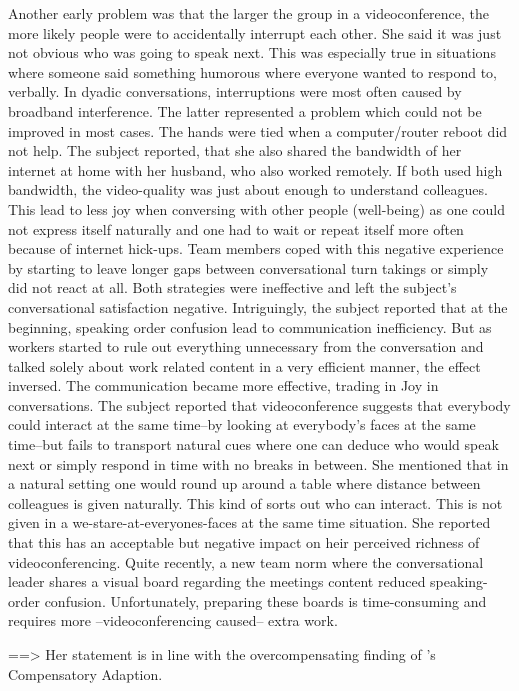 \documentclass[man]{apa7}
\begin{document}
Another early problem was that the larger the group in a videoconference, the more likely people were to accidentally interrupt each other. She said it was just not obvious who was going to speak next. This was especially true in situations where someone said something humorous where everyone wanted to respond to, verbally. In dyadic conversations, interruptions were most often caused by broadband interference. The latter represented a problem which could not be improved in most cases. The hands were tied when a computer/router reboot did not help. The subject reported, that she also shared the bandwidth of her internet at home with her husband, who also worked remotely. If both used high bandwidth, the video-quality was just about enough to understand colleagues. This lead to less joy when conversing with other people (well-being) as one could not express itself naturally and one had to wait or repeat itself more often because of internet hick-ups. Team members coped with this negative experience by starting to leave longer gaps between conversational turn takings or simply did not react at all. Both strategies were ineffective and left the subject's conversational satisfaction negative. Intriguingly, the subject reported that at the beginning, speaking order confusion lead to communication inefficiency. But as workers started to rule out everything unnecessary from the conversation and talked solely about work related content in a very efficient manner, the effect inversed. The communication became more effective, trading in Joy in conversations. The subject reported that videoconference suggests that everybody could interact at the same time–by looking at everybody's faces at the same time–but fails to transport natural cues where one can deduce who would speak next or simply respond in time with no breaks in between. She mentioned that in a natural setting one would round up around a table where distance between colleagues is given naturally. This kind of sorts out who can interact. This is not given in a we-stare-at-everyones-faces at the same time situation. She reported that this has an acceptable but negative impact on heir perceived richness of videoconferencing. Quite recently, a new team norm where the conversational leader shares a visual board regarding the meetings content reduced speaking-order confusion. Unfortunately, preparing these boards is time-consuming and requires more –videoconferencing caused– extra work.

==> Her statement is in line with the overcompensating finding of \citeauthor{Kock2005}'s Compensatory Adaption.
\end{document}
